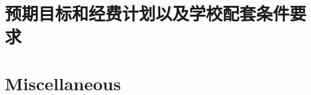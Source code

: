 \ifChinese

\section*{预期目标和经费计划以及学校配套条件要求}

\zhlipsum[10-12]

\else  %

\section*{Miscellaneous}

\lipsum[10-12]

\fi  %
